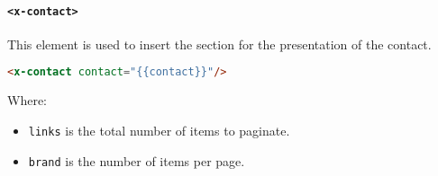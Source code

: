 \paragraph{\texttt{<x-contact>}}This element is used to insert the section for the presentation of the contact.
\begin{lstlisting}[language=html]
<x-contact contact="{{contact}}"/>\end{lstlisting}
Where:
\begin{itemize}
\item \texttt{links} is the total number of items to paginate.
\item \texttt{brand} is the number of items per page.
\end{itemize}
